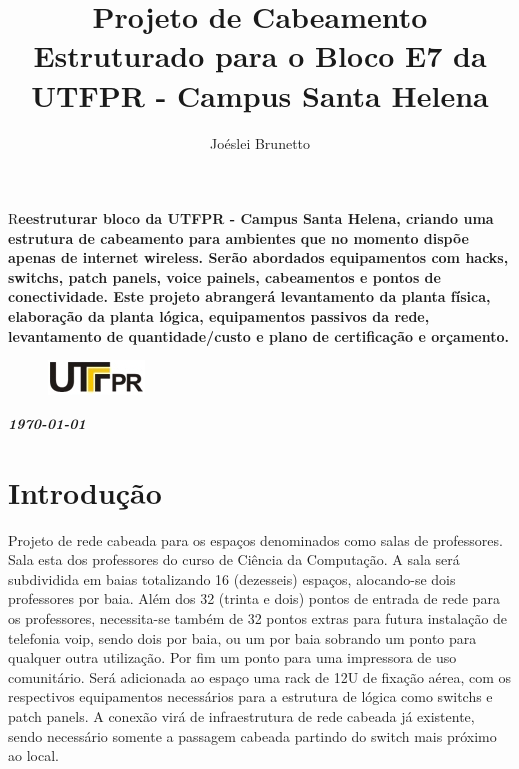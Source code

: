 \documentclass[	DIV=calc,
							paper=a4,
							fontsize=12pt,
							onecolumn]{scrartcl}
\title{Projeto de Cabeamento Estruturado para o Bloco E7 da UTFPR - Campus Santa Helena}
\author{Joéslei Brunetto}
\date{}
\newcommand{\initial}[1]{%
     \lettrine[lines=3,lhang=0.3,nindent=0em]{
     				\color{DarkGoldenrod}
     				{\textsf{#1}}}{}}
\begin{document}
\maketitle
\thispagestyle{fancy} 	
\thispagestyle{empty}	 

\initial{R}\textbf{eestruturar bloco da UTFPR - Campus Santa Helena, criando uma estrutura de cabeamento para ambientes que no momento dispõe apenas de internet wireless. Serão abordados equipamentos com hacks, switchs, patch panels, voice painels, cabeamentos e pontos de conectividade. Este projeto abrangerá levantamento da planta física, elaboração da planta lógica, equipamentos passivos da rede, levantamento de quantidade/custo e plano de certificação e orçamento.}

\begin{figure}
	\centering
	\includegraphics{utfpr}
\end{figure}

\vspace{2cm}
\centerline{\textit{\textbf{\today}}}

\clearpage
    \renewcommand*\listfigurename{Lista de figuras}
\listoffigures

\renewcommand*\listtablename{Lista de tabelas}
\listoftables

\clearpage
\renewcommand{\contentsname}{Sumário}
\tableofcontents
\clearpage

\section{Introdução}
Projeto de rede cabeada para os espaços denominados como salas de professores. Sala esta dos professores do curso de Ciência da Computação. A sala será subdividida em baias totalizando 16 (dezesseis) espaços, alocando-se dois professores por baia. Além dos 32 (trinta e dois) pontos de entrada de rede para os professores, necessita-se também de 32 pontos extras para futura instalação de telefonia voip, sendo dois por baia, ou um por baia sobrando um ponto para qualquer outra utilização. Por fim um ponto para uma impressora de uso comunitário.
Será adicionada ao espaço uma rack de 12U de fixação aérea, com os respectivos equipamentos necessários para a estrutura de lógica como switchs e patch panels. A conexão virá de infraestrutura de rede cabeada já existente, sendo necessário somente a passagem cabeada partindo do switch mais próximo ao local.
\end{document}
